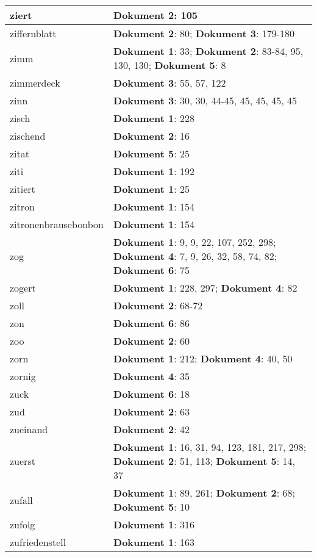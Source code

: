 \documentclass[a5paper]{article}
\begin{document}
\begin{longtable}[l]{|l|p{3in}|}
\hline
ziert & \textbf{Dokument 2}: 105 \\
\hline
ziffernblatt & \textbf{Dokument 2}: 80; \textbf{Dokument 3}: 179-180 \\
\hline
zimm & \textbf{Dokument 1}: 33; \textbf{Dokument 2}: 83-84, 95, 130, 130; \textbf{Dokument 5}: 8 \\
\hline
zimmerdeck & \textbf{Dokument 3}: 55, 57, 122 \\
\hline
zinn & \textbf{Dokument 3}: 30, 30, 44-45, 45, 45, 45, 45 \\
\hline
zisch & \textbf{Dokument 1}: 228 \\
\hline
zischend & \textbf{Dokument 2}: 16 \\
\hline
zitat & \textbf{Dokument 5}: 25 \\
\hline
ziti & \textbf{Dokument 1}: 192 \\
\hline
zitiert & \textbf{Dokument 1}: 25 \\
\hline
zitron & \textbf{Dokument 1}: 154 \\
\hline
zitronenbrausebonbon & \textbf{Dokument 1}: 154 \\
\hline
zog & \textbf{Dokument 1}: 9, 9, 22, 107, 252, 298; \textbf{Dokument 4}: 7, 9, 26, 32, 58, 74, 82; \textbf{Dokument 6}: 75 \\
\hline
zogert & \textbf{Dokument 1}: 228, 297; \textbf{Dokument 4}: 82 \\
\hline
zoll & \textbf{Dokument 2}: 68-72 \\
\hline
zon & \textbf{Dokument 6}: 86 \\
\hline
zoo & \textbf{Dokument 2}: 60 \\
\hline
zorn & \textbf{Dokument 1}: 212; \textbf{Dokument 4}: 40, 50 \\
\hline
zornig & \textbf{Dokument 4}: 35 \\
\hline
zuck & \textbf{Dokument 6}: 18 \\
\hline
zud & \textbf{Dokument 2}: 63 \\
\hline
zueinand & \textbf{Dokument 2}: 42 \\
\hline
zuerst & \textbf{Dokument 1}: 16, 31, 94, 123, 181, 217, 298; \textbf{Dokument 2}: 51, 113; \textbf{Dokument 5}: 14, 37 \\
\hline
zufall & \textbf{Dokument 1}: 89, 261; \textbf{Dokument 2}: 68; \textbf{Dokument 5}: 10 \\
\hline
zufolg & \textbf{Dokument 1}: 316 \\
\hline
zufriedenstell & \textbf{Dokument 1}: 163 \\

\end{longtable}
\end{document}
